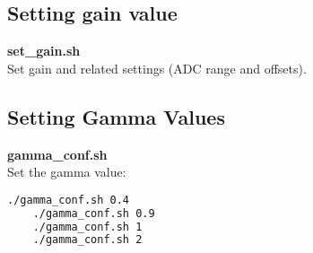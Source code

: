 \subsection{Setting gain value}

\textbf{set\_gain.sh}\\

Set gain and related settings (ADC range and offsets). 




\subsection{Setting Gamma Values}

\textbf{gamma\_conf.sh}\\

Set the gamma value: 

\begin{lstlisting}[language=bash,morekeywords=$,keywordstyle=\bfseries,frame=none,xleftmargin=.25in,belowskip=2em]
    ./gamma_conf.sh 0.4
    ./gamma_conf.sh 0.9
    ./gamma_conf.sh 1
    ./gamma_conf.sh 2
\end{lstlisting}

